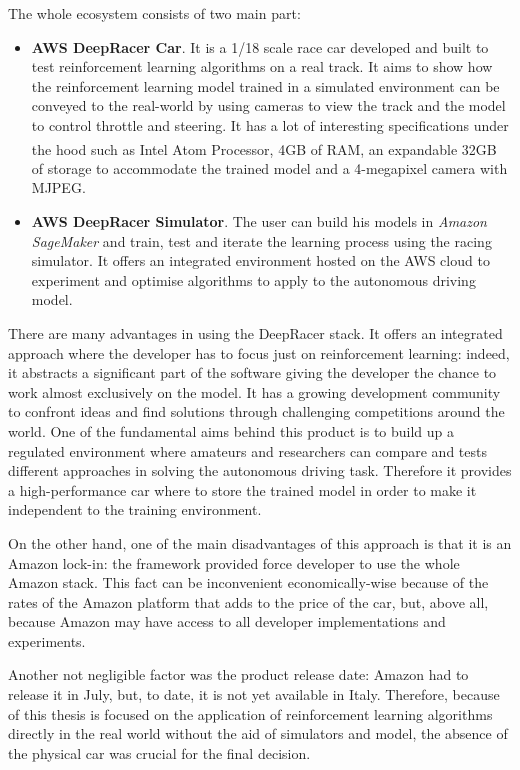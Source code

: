 The whole ecosystem consists of two main part:
\begin{itemize}
	\item \textbf{AWS DeepRacer Car}.
It is a 1/18 scale race car developed and built to test reinforcement learning algorithms on a real track.
It aims to show how the reinforcement learning model trained in a simulated environment can be conveyed to the real-world by using cameras to view the track and the model to control throttle and steering.
It has a lot of interesting specifications under the hood such as Intel Atom \textsuperscript{\textregistered} Processor, 4GB of RAM, an expandable 32GB of storage to accommodate the trained model and a 4-megapixel camera with MJPEG.
	\item \textbf{AWS DeepRacer Simulator}.
The user can build his models in \textit{Amazon SageMaker} and train, test and iterate the learning process using the racing simulator.
It offers an integrated environment hosted on the AWS cloud to experiment and optimise algorithms to apply to the autonomous driving model.
\end{itemize}

There are many advantages in using the DeepRacer stack.
It offers an integrated approach where the developer has to focus just on reinforcement learning: indeed, it abstracts a significant part of the software giving the developer the chance to work almost exclusively on the model.
It has a growing development community to confront ideas and find solutions through challenging competitions around the world.
One of the fundamental aims behind this product is to build up a regulated environment where amateurs and researchers can compare and tests different approaches in solving the autonomous driving task.
Therefore it provides a high-performance car where to store the trained model in order to make it independent to the training environment.


On the other hand, one of the main disadvantages of this approach is that it is an Amazon lock-in: the framework provided force developer to use the whole Amazon stack.
This fact can be inconvenient economically-wise because of the rates of the Amazon platform that adds to the price of the car, but, above all, because Amazon may have access to all developer implementations and experiments.

Another not negligible factor was the product release date: Amazon had to release it in July, but, to date, it is not yet available in Italy.
Therefore, because of this thesis is focused on the application of reinforcement learning algorithms directly in the real world without the aid of simulators and model, the absence of the physical car was crucial for the final decision.

